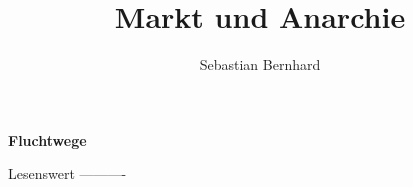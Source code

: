 \documentclass{bookest}
\newcommand\strong[1]{{\Large\bfseries{#1}}}
\begin{document}
\author{Sebastian Bernhard}
\title{Markt und Anarchie}
\maketitle
\tableofcontents













\strong{Fluchtwege}





Lesenswert
----------
\cite{zimmerman1997socialecology}



 
\printglossaries{}
\end{document}
